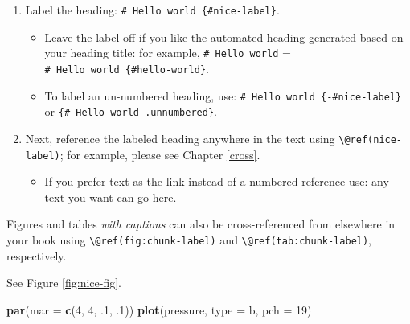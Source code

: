 \documentclass[
  20pt,
]{book}
\newenvironment{Shaded}{\begin{snugshade}}{\end{snugshade}}
\newcommand{\AttributeTok}[1]{\textcolor[rgb]{0.13,0.29,0.53}{#1}}
\newcommand{\DecValTok}[1]{\textcolor[rgb]{0.00,0.00,0.81}{#1}}
\newcommand{\FunctionTok}[1]{\textcolor[rgb]{0.13,0.29,0.53}{\textbf{#1}}}
\newcommand{\NormalTok}[1]{#1}
\newcommand{\StringTok}[1]{\textcolor[rgb]{0.31,0.60,0.02}{#1}}
\providecommand{\tightlist}{%
  \setlength{\itemsep}{0pt}\setlength{\parskip}{0pt}}
\theoremstyle{definition}
\theoremstyle{definition}
\theoremstyle{definition}
\theoremstyle{definition}
\theoremstyle{remark}
\begin{document}
\begin{enumerate}
\def\labelenumi{\arabic{enumi}.}
\tightlist
\item
  Label the heading: \texttt{\#\ Hello\ world\ \{\#nice-label\}}.

  \begin{itemize}
  \tightlist
  \item
    Leave the label off if you like the automated heading generated based on your heading title: for example, \texttt{\#\ Hello\ world} = \texttt{\#\ Hello\ world\ \{\#hello-world\}}.
  \item
    To label an un-numbered heading, use: \texttt{\#\ Hello\ world\ \{-\#nice-label\}} or \texttt{\{\#\ Hello\ world\ .unnumbered\}}.
  \end{itemize}
\item
  Next, reference the labeled heading anywhere in the text using \texttt{\textbackslash{}@ref(nice-label)}; for example, please see Chapter \ref{cross}.

  \begin{itemize}
  \tightlist
  \item
    If you prefer text as the link instead of a numbered reference use: \hyperref[cross]{any text you want can go here}.
  \end{itemize}
\end{enumerate}

Figures and tables \emph{with captions} can also be cross-referenced from elsewhere in your book using \texttt{\textbackslash{}@ref(fig:chunk-label)} and \texttt{\textbackslash{}@ref(tab:chunk-label)}, respectively.

See Figure \ref{fig:nice-fig}.

\begin{Shaded}
\begin{Highlighting}[]
\FunctionTok{par}\NormalTok{(}\AttributeTok{mar =} \FunctionTok{c}\NormalTok{(}\DecValTok{4}\NormalTok{, }\DecValTok{4}\NormalTok{, .}\DecValTok{1}\NormalTok{, .}\DecValTok{1}\NormalTok{))}
\FunctionTok{plot}\NormalTok{(pressure, }\AttributeTok{type =} \StringTok{\textquotesingle{}b\textquotesingle{}}\NormalTok{, }\AttributeTok{pch =} \DecValTok{19}\NormalTok{)}
\end{Highlighting}
\end{Shaded}
\end{document}
